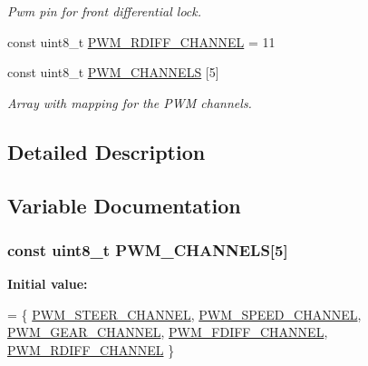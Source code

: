 \begin{DoxyCompactItemize}
\begin{DoxyCompactList}\small\item\em Pwm pin for front differential lock. \end{DoxyCompactList}\item 
const uint8\+\_\+t \hyperlink{group__PwmOutputChannels_ga2e4d0ce85dd092067453618a88db0ac6}{P\+W\+M\+\_\+\+R\+D\+I\+F\+F\+\_\+\+C\+H\+A\+N\+N\+EL} = 11
\item 
const uint8\+\_\+t \hyperlink{group__PwmOutputChannels_gad8b2f525f688762ad7fd186771ead0b8}{P\+W\+M\+\_\+\+C\+H\+A\+N\+N\+E\+LS} \mbox{[}5\mbox{]}
\begin{DoxyCompactList}\small\item\em Array with mapping for the P\+WM channels. \end{DoxyCompactList}\end{DoxyCompactItemize}


\subsection{Detailed Description}


\subsection{Variable Documentation}
\subsubsection[{\texorpdfstring{P\+W\+M\+\_\+\+C\+H\+A\+N\+N\+E\+LS}{PWM_CHANNELS}}]{\setlength{\rightskip}{0pt plus 5cm}const uint8\+\_\+t P\+W\+M\+\_\+\+C\+H\+A\+N\+N\+E\+LS\mbox{[}5\mbox{]}}\hypertarget{group__PwmOutputChannels_gad8b2f525f688762ad7fd186771ead0b8}{}\label{group__PwmOutputChannels_gad8b2f525f688762ad7fd186771ead0b8}
{\bfseries Initial value\+:}
\begin{DoxyCode}
= \{
                              \hyperlink{group__PwmOutputChannels_ga66104e4dc16a69aecae1e217ffb0c006}{PWM\_STEER\_CHANNEL},
                              \hyperlink{group__PwmOutputChannels_ga93d060ae523eab7a0c1c34b9ac646313}{PWM\_SPEED\_CHANNEL},
                              \hyperlink{group__PwmOutputChannels_gad993d35a100ed514d5de22d43c52bbf3}{PWM\_GEAR\_CHANNEL},
                              \hyperlink{group__PwmOutputChannels_ga627cee35c7979d79719e12d6c22145e9}{PWM\_FDIFF\_CHANNEL},
                              \hyperlink{group__PwmOutputChannels_ga2e4d0ce85dd092067453618a88db0ac6}{PWM\_RDIFF\_CHANNEL}
                              \}
\end{DoxyCode}


